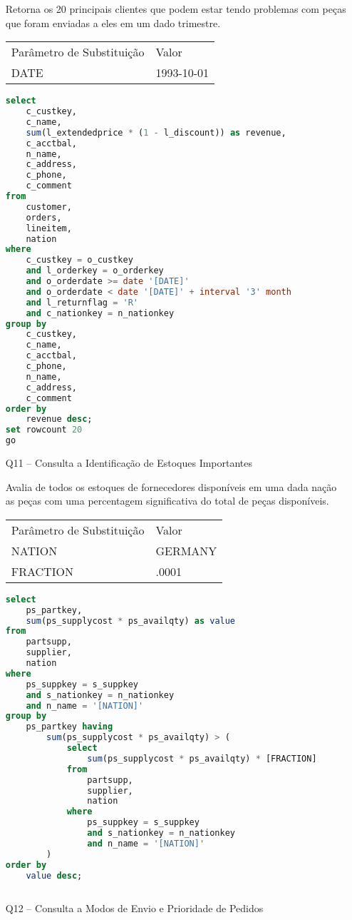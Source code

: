 \begin{enumerate}
    Retorna os 20 principais clientes que podem estar tendo problemas com peças que foram enviadas a eles em um dado trimestre.
    
\begin{tabular}{ll}
	Parâmetro de Substituição & Valor\\
	DATE & 1993-10-01\\
\end{tabular}

	\begin{lstlisting}[language=SQL]
select
	c_custkey,
	c_name,
	sum(l_extendedprice * (1 - l_discount)) as revenue,
	c_acctbal,
	n_name,
	c_address,
	c_phone,
	c_comment
from
	customer,
	orders,
	lineitem,
	nation
where
	c_custkey = o_custkey
	and l_orderkey = o_orderkey
	and o_orderdate >= date '[DATE]'
	and o_orderdate < date '[DATE]' + interval '3' month
	and l_returnflag = 'R'
	and c_nationkey = n_nationkey
group by
	c_custkey,
	c_name,
	c_acctbal,
	c_phone,
	n_name,
	c_address,
	c_comment
order by
	revenue desc;
set rowcount 20
go
	\end{lstlisting}

\item[Q11 --] Consulta a Identificação de Estoques Importantes
    
    Avalia de todos os estoques de fornecedores disponíveis em uma dada nação as peças com uma percentagem significativa do total de peças disponíveis.
    
\begin{tabular}{ll}
	Parâmetro de Substituição & Valor\\
	NATION & GERMANY\\
	FRACTION & .0001\\
\end{tabular}

	\begin{lstlisting}[language=SQL]
select
	ps_partkey,
	sum(ps_supplycost * ps_availqty) as value
from
	partsupp,
	supplier,
	nation
where
	ps_suppkey = s_suppkey
	and s_nationkey = n_nationkey
	and n_name = '[NATION]'
group by
	ps_partkey having
		sum(ps_supplycost * ps_availqty) > (
			select
				sum(ps_supplycost * ps_availqty) * [FRACTION]
			from
				partsupp,
				supplier,
				nation
			where
				ps_suppkey = s_suppkey
				and s_nationkey = n_nationkey
				and n_name = '[NATION]'
		)
order by
	value desc;
	
	\end{lstlisting}

\item[Q12 --] Consulta a Modos de Envio e Prioridade de Pedidos


\end{enumerate}
